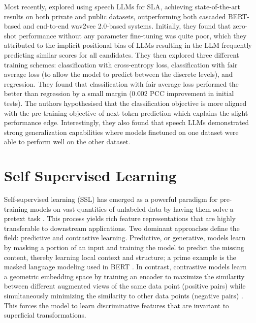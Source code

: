 \documentclass{report}
\begin{document}
Most recently, \citet{ma2025assessment} explored using speech LLMs for SLA, achieving state-of-the-art results on both private \citep{Ludlow2020OfficialQuick} and public \citep{knill2024sandi} datasets, outperforming both cascaded BERT-based and end-to-end wav2vec 2.0-based systems. Initially, they found that zero-shot performance without any parameter fine-tuning was quite poor, which they attributed to the implicit positional bias of LLMs \citep{liusie2023mitigatingwordbiaszeroshot} resulting in the LLM frequently predicting similar scores for all candidates. They then explored three different training schemes: classification with cross-entropy loss, classification with fair average loss (to allow the model to predict between the discrete levels), and regression. They found that classification with fair average loss performed the better than regression by a small margin (0.002 PCC improvement in initial tests). The authors hypothesised that the classification objective is more aligned with the pre-training objective of next token prediction which explains the slight performance edge. Interestingly, they also found that speech LLMs demonstrated strong generalization capabilities where models finetuned on one dataset were able to perform well on the other dataset.

\section{Self Supervised Learning}
\label{sec:self_supervised_learning}
Self-supervised learning (SSL) has emerged as a powerful paradigm for pre-training models on vast quantities of unlabeled data by having them solve a pretext task \citep{balestriero2023cookbookselfsupervisedlearning}. This process yields rich feature representations that are highly transferable to downstream applications. Two dominant approaches define the field: predictive and contrastive learning. Predictive, or generative, models learn by masking a portion of an input and training the model to predict the missing content, thereby learning local context and structure; a prime example is the masked language modeling used in BERT \citep{devlin2019bertpretrainingdeepbidirectional}. In contrast, contrastive models learn a geometric embedding space by training an encoder to maximize the similarity between different augmented views of the same data point (positive pairs) while simultaneously minimizing the similarity to other data points (negative pairs) \citep{chen2020simpleframeworkcontrastivelearning}. This forces the model to learn discriminative features that are invariant to superficial transformations.
\end{document}
